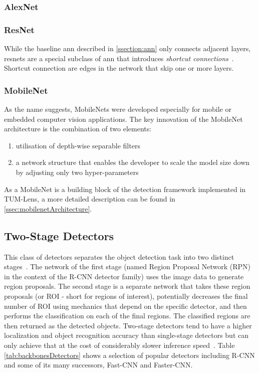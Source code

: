 \documentclass[
			   fontsize=11pt,
               paper=a4,
               bibliography=totoc,
               idxtotoc,
               headsepline,
               footsepline,
               footinclude=false,
               BCOR=12mm,
               DIV=13,
               openany,   %
               ]
               {scrbook}
\begin{document}
\subsubsection{AlexNet}



\subsubsection{ResNet}

While the baseline \gls{ann} described in \autoref{ssection:ann} only connects adjacent layers, \glspl{resnet} are a special subclass of \gls{ann} that introduces \textit{shortcut connections}~\cite{backboneResNet}. Shortcut connection are edges in the network that skip one or more layers.

\subsubsection{MobileNet}
As the name suggests, MobileNets were developed especially for mobile or embedded computer vision applications. The key innovation of the MobileNet architecture is the combination of two elements:
\begin{enumerate}
	\item utilisation of depth-wise separable filters~\cite{depthSep}
	\item a network structure that enables the developer to scale the model size down by adjusting only two hyper-parameters
\end{enumerate}
As a MobileNet is a building block of the detection framework implemented in TUM-Lens, a more detailed description can be found in \autoref{ssec:mobilenetArchitecture}.


\subsection{Two-Stage Detectors}

This class of detectors separates the object detection task into two distinct stages~\cite{12stageSYNASC2018}. The network of the first stage (named Region Proposal Network (RPN) in the context of the R-CNN detector family) uses the image data to generate region proposals. The second stage is a separate network that takes these region proposals (or ROI - short for regions of interest), potentially decreases the final number of ROI using mechanics that depend on the specific detector, and then performs the classification on each of the final regions. The classified regions are then returned as the detected objects. Two-stage detectors tend to have a higher localization and object recognition accuracy than single-stage detectors but can only achieve that at the cost of considerably slower inference speed~\cite{surveyICBDT2019}. Table \autoref{tab:backbonesDetectors} shows a selection of popular detectors including R-CNN and some of its many successors, Fast-CNN and Faster-CNN.
\end{document}
